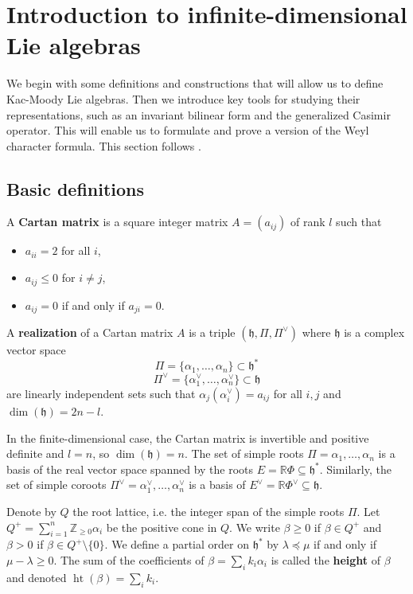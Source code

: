 \documentclass[12pt]{article}
\begin{document}
\section{Introduction to infinite-dimensional Lie algebras}
We begin with some definitions and constructions that will allow us to define Kac-Moody Lie algebras. Then we introduce key tools for studying their representations, such as an invariant bilinear form and the generalized Casimir operator. This will enable us to formulate and prove a version of the Weyl character formula.
This section follows \cite{kac}.
\subsection{Basic definitions}
\begin{definition}
    A \textbf{Cartan matrix} is a square integer matrix $A = (a_{ij})$ of rank $l$ such that
    \begin{itemize}
        \item $a_{ii} = 2$ for all $i$,
        \item $a_{ij} \leq 0$ for $i \neq j$,
        \item $a_{ij} = 0$ if and only if $a_{ji} = 0$.
    \end{itemize}
    A \textbf{realization} of a Cartan matrix $A$ is a triple $(\mathfrak{h}, \Pi, \Pi^\vee)$ where $\mathfrak{h}$ is a complex vector space \[\Pi = \{\alpha_1, \dots, \alpha_n\} \subset \mathfrak{h}^*\]  \[\Pi^\vee = \{\alpha_1^\vee, \dots, \alpha_n^\vee\} \subset \mathfrak{h}\] are linearly independent sets such that $\alpha_j(\alpha_i^\vee) = a_{ij}$ for all $i,j$ and $\dim(\mathfrak{h}) = 2n - l$.
\end{definition}

\begin{remark}
    In the finite-dimensional case, the Cartan matrix is invertible and positive definite and $l = n$, so $\dim(\mathfrak{h}) = n$. The set of simple roots $\Pi = {\alpha_1, \dots, \alpha_n}$ is a basis of the real vector space spanned by the roots $E = \mathbb{R}\Phi \subseteq \mathfrak{h}^*$. Similarly, the set of simple coroots $\Pi^\vee = {\alpha_1^\vee, \dots, \alpha_n^\vee}$ is a basis of $E^\vee = \mathbb{R}\Phi^\vee \subseteq \mathfrak{h}$.
\end{remark}

Denote by $Q$ the root lattice, i.e. the integer span of the simple roots $\Pi$. Let $Q^+ = \sum_{i=1}^n \mathbb{Z}_{\geq 0} \alpha_i$ be the positive cone in $Q$. We write $\beta \geq 0$ if $\beta \in Q^+$ and $\beta > 0$ if $\beta \in Q^+ \setminus \{0\}$. We define a partial order on $\mathfrak{h}^*$ by $\lambda \preceq \mu$ if and only if $\mu - \lambda \geq 0$. The sum of the coefficients of $\beta = \sum_i k_i \alpha_i$ is called the \textbf{height} of $\beta$ and denoted $\operatorname{ht}(\beta) = \sum_i k_i$.
\end{document}
